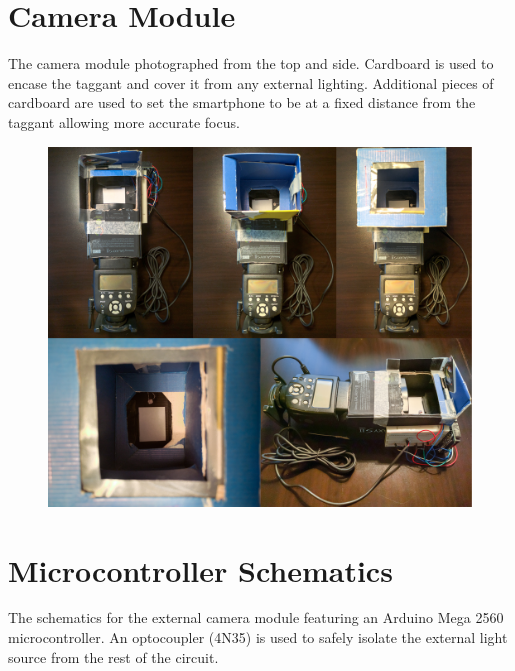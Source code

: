 \documentclass[thesis.tex]{subfiles}
\begin{document}
\chapter{Camera Module}
\label{appendix:camera-module}

The camera module photographed from the top and side. Cardboard is used to encase the taggant and cover it from any external lighting. Additional pieces of cardboard are used to set the smartphone to be at a fixed distance from the taggant allowing more accurate focus.

\begin{figure}[h]
\centering \includegraphics[width=\textwidth,height=\textheight,keepaspectratio=true]{images/design_implementation/camera-module-actual.jpg}
\end{figure}




\chapter{Microcontroller Schematics}
\label{appendix:camera-module-schematics}

The schematics for the external camera module featuring an Arduino Mega 2560 microcontroller. An optocoupler (4N35) is used to safely isolate the external light source from the rest of the circuit.
\end{document}
